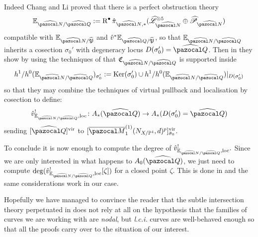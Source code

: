 \documentclass[11pt]{amsart}
\newcommand{\Mone}[3]{\overline{\pazocal M}^{(1)}_{#1}(#2,#3)}
\newcommand{\PP}{\mathbb P}
\renewcommand{\to}{\rightarrow}
\newcommand{\hL}{\widehat{\mathcal L}}
\newcommand{\hP}{\widehat{\mathfrak P}}
\newcommand{\R}{\operatorname{R}}
\theoremstyle{plain}
\theoremstyle{definition}
\begin{document}
Indeed Chang and Li proved that there is a perfect obstruction theory 
\[\mathbb E_{\widehat{\pazocal N}/\widehat{\pazocal Q}}:=\R^{\bullet}\hat\pi_{\widehat{\pazocal N},*}(\hL^{\otimes 5}_{\widehat{\pazocal N}}\oplus \widehat{\mathcal P}_{\widehat{\pazocal N}})\]
 compatible with $\mathbb E_{\widehat{\pazocal N}/\hP}$ and $\hat v^*\mathbb E_{\widehat{\pazocal Q}/\hP}$, so that $\mathbb E_{\widehat{\pazocal N}/\widehat{\pazocal Q}}$ inherits a cosection $\sigma_0'$ with degeneracy locus $D(\sigma_0')=\widehat{\pazocal Q}$. Then in \cite[Lemma 5.5]{CLpfields} they show by using the techniques of \cite{KKP} that $\mathfrak C_{\widehat{\pazocal N}/\widehat{\pazocal Q}}$ is supported inside 
\[
 h^1/h^0(\mathbb E_{\widehat{\pazocal N}/\widehat{\pazocal Q}})_{\sigma_0'}:=\operatorname{Ker}(\sigma_0')\cup  h^1/h^0(\mathbb E_{\widehat{\pazocal N}/\widehat{\pazocal Q}})\rvert_{D(\sigma_0')}
\]
so that they may combine the techniques of virtual pullback \cite{Manolache-pullback} and localisation by cosection \cite{KLcosection} to define:
\[
 \hat v^!_{\mathbb E_{\widehat{\pazocal N}/\widehat{\pazocal Q}},\rm{loc}}\colon A_*(\widehat{\pazocal Q})\to A_*(D(\sigma_0')=\widehat{\pazocal Q})
\]
sending $[\widehat{\pazocal Q}]^{\rm{vir}}$ to $[\Mone{1}{N_{X/\PP^4}}{d}^p]^{\rm{vir}}_{\rm{\bar\sigma_0}}.$

To conclude it is now enough to compute the degree of $\hat v^!_{\mathbb E_{\widehat{\pazocal N}/\widehat{\pazocal Q}},\rm{loc}}.$
Since we are only interested in what happens to $A_0(\widehat{\pazocal Q})$, we just need to compute $\deg(\hat v^!_{\mathbb E_{\widehat{\pazocal N}/\widehat{\pazocal Q}},\rm{loc}}[\zeta])$ for a closed point $\zeta$. This is done in \cite[Theorem 5.7]{CLpfields} and the same considerations work in our case.

Hopefully we have managed to convince the reader that the subtle intersection theory perpetuated in \cite{CLpfields} does not rely at all on the hypothesis that the families of curves we are working with are \emph{nodal}, but \emph{l.c.i.} curves are well-behaved enough so that all the proofs carry over to the situation of our interest.
\end{document}
